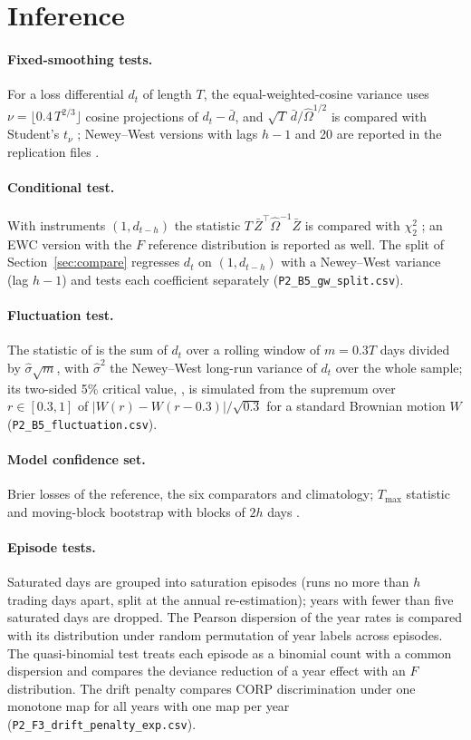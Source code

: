 \documentclass[preprint,12pt,authoryear]{elsarticle}
\begin{document}
\section{Inference}\label{app:inference}
\paragraph{Fixed-smoothing tests.} For a loss differential $d_t$ of length $T$, the equal-weighted-cosine variance uses $\nu=\lfloor0.4\,T^{2/3}\rfloor$ cosine projections of $d_t-\bar d$, and $\sqrt T\,\bar d/\hat\Omega^{1/2}$ is compared with Student's $t_\nu$ \citep{lazarus2018,coroneo2020}; Newey--West versions with lags $h-1$ and 20 are reported in the replication files \citep{newey1987}.
\paragraph{Conditional test.} With instruments $(1,d_{t-h})$ the statistic $T\,\bar Z^\top\hat\Omega^{-1}\bar Z$ is compared with $\chi^2_2$ \citep{giacomini2006}; an EWC version with the $F$ reference distribution is reported as well. The split of Section~\ref{sec:compare} regresses $d_t$ on $(1,d_{t-h})$ with a Newey--West variance (lag $h-1$) and tests each coefficient separately (\nolinkurl{P2_B5_gw_split.csv}).
\paragraph{Fluctuation test.} The statistic of \citet{giacomini2010} is the sum of $d_t$ over a rolling window of $m=0.3T$ days divided by $\hat\sigma\sqrt m$, with $\hat\sigma^2$ the Newey--West long-run variance of $d_t$ over the whole sample; its two-sided 5\% critical value, \GRcrit, is simulated from the supremum over $r\in[0.3,1]$ of $|W(r)-W(r-0.3)|/\sqrt{0.3}$ for a standard Brownian motion $W$ (\nolinkurl{P2_B5_fluctuation.csv}).
\paragraph{Model confidence set.} Brier losses of the reference, the six comparators and climatology; $T_{\max}$ statistic and moving-block bootstrap with blocks of $2h$ days \citep{hansen2011}.
\paragraph{Episode tests.} Saturated days are grouped into saturation episodes (runs no more than $h$ trading days apart, split at the annual re-estimation); years with fewer than five saturated days are dropped. The Pearson dispersion of the year rates is compared with its distribution under random permutation of year labels across episodes. The quasi-binomial test treats each episode as a binomial count with a common dispersion and compares the deviance reduction of a year effect with an $F$ distribution. The drift penalty compares CORP discrimination under one monotone map for all years with one map per year (\nolinkurl{P2_F3_drift_penalty_exp.csv}).
\end{document}
